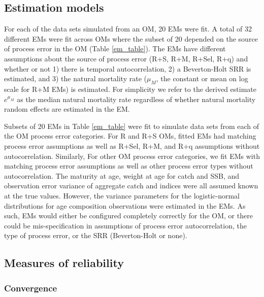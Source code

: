 \documentclass[
  12pt,
]{article}
\begin{document}
\hypertarget{estimation-models}{%
\subsection*{Estimation models}\label{estimation-models}}

For each of the data sets simulated from an OM, 20 EMs were fit. A total
of 32 different EMs were fit across OMs where the subset of 20 depended
on the source of process error in the OM (Table \ref{em_table}). The EMs
have different assumptions about the source of process error (R+S, R+M,
R+Sel, R+q) and whether or not 1) there is temporal autocorrelation, 2)
a Beverton-Holt SRR is estimated, and 3) the natural mortality rate
(\(\mu_M\), the constant or mean on log scale for R+M EMs) is estimated.
For simplicity we refer to the derived estimate \(e^{\mu_M}\) as the
median natural mortality rate regardless of whether natural mortality
random effects are estimated in the EM.

Subsets of 20 EMs in Table \ref{em_table} were fit to simulate data sets
from each of the OM process error categories. For R and R+S OMs, fitted
EMs had matching process error assumptions as well as R+Sel, R+M, and
R+q assumptions without autocorrelation. Similarly, For other OM process
error categories, we fit EMs with matching process error assumptions as
well as other process error types without autocorrelation. The maturity
at age, weight at age for catch and SSB, and observation error variance
of aggregate catch and indices were all assumed known at the true
values. However, the variance parameters for the logistic-normal
distributions for age composition observations were estimated in the
EMs. As such, EMs would either be configured completely correctly for
the OM, or there could be mis-specification in assumptions of process
error autocorrelation, the type of process error, or the SRR
(Beverton-Holt or none).

\hypertarget{measures-of-reliability}{%
\subsection*{Measures of reliability}\label{measures-of-reliability}}

\hypertarget{convergence}{%
\subsubsection*{Convergence}\label{convergence}}
\end{document}
